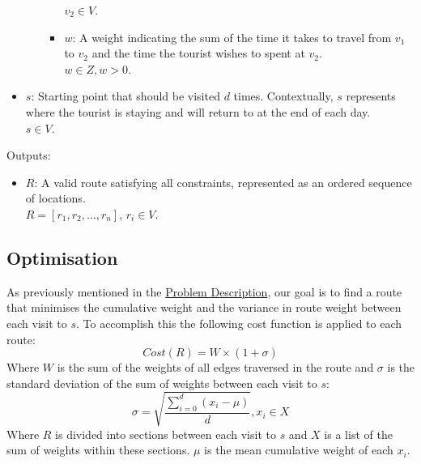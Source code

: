 \begin{itemize}
\begin{itemize}
\begin{itemize}
            $v_2 \in V$.
            \item[\textbullet]$w$: A weight indicating the sum of the time it takes to travel from $v_1$ to $v_2$
            and the time the tourist wishes to spent at $v_2$.\\
            $w \in Z, w > 0$.
        \end{itemize}
    \end{itemize}
    \item $s$: Starting point that should be visited $d$ times.
    Contextually, $s$ represents where the tourist is staying and will return to at the end of each day.\\
    $s \in V$.
\end{itemize}
Outputs:
    \begin{itemize}
    \item $R$: A valid route satisfying all constraints, represented as an ordered sequence of locations.\\
    $R = [r_1, r_2, \dots, r_n]$, $r_i \in V$.
\end{itemize}

\subsection{Optimisation}\label{subsec:optimisation}
As previously mentioned in the \hyperref[subsec:problem-description]{Problem Description}, our goal is to find a
route that minimises the cumulative weight and the variance in route weight between each visit to $s$.
To accomplish this the following cost function is applied to each route:
\begin{equation}
    Cost(R) = W \times (1 + \sigma)\label{eq:cost}
\end{equation}
Where $W$ is the sum of the weights of all edges traversed in the route and $\sigma$ is the standard deviation of the
sum of weights between each visit to $s$:
\begin{equation}
    \sigma = \sqrt{\frac{\sum_{i=0}^{d}(x_i-\mu)}{d}}, x_i \in X\label{eq:standard-deviation}
\end{equation}
Where $R$ is divided into sections between each visit to $s$ and $X$ is a list of the sum of weights within these
sections.
$\mu$ is the mean cumulative weight of each $x_i$.\\\\